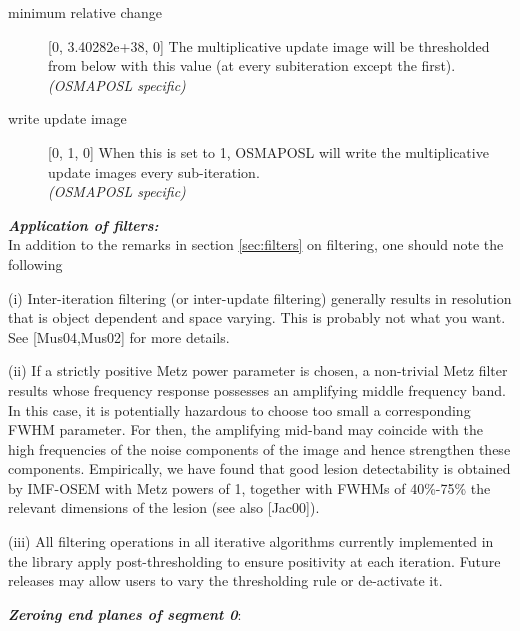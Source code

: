 \documentclass{article}
\begin{document}
\begin{description}
\item[minimum relative change] [0, 3.40282e+38, 0{]}
The multiplicative update image will be thresholded from below 
with this value (at every subiteration except the first).\\
\textit{(OSMAPOSL specific)}


\item[write update image] [0, 1, 0{]}
When this is set to 1, OSMAPOSL will write the multiplicative 
update images every sub-iteration.\\
\textit{(OSMAPOSL specific)}

\end{description}


{
}
\label{sec:OSMAPOSLtechnotes}

\textbf{\textit{Application of filters:}} \\
In addition to the remarks in section \ref{sec:filters} on filtering, 
one should 
note the following


(i) Inter-iteration filtering (or inter-update filtering) generally 
results in resolution that is object dependent and space varying. 
This is probably not what you want. See [Mus04,Mus02] for more 
details.



(ii) If a strictly positive Metz power parameter is chosen, a 
non-trivial Metz filter results whose frequency response possesses 
an amplifying middle frequency band. In this case, it is potentially 
hazardous to choose too small a corresponding FWHM parameter. 
For then, the amplifying mid-band may coincide with the high 
frequencies of the noise components of the image and hence strengthen 
these components. Empirically, we have found that good lesion 
detectability is obtained by IMF-OSEM with Metz powers of 1, 
together with FWHMs of 40\%-75\% the relevant dimensions of the 
lesion (see also [Jac00]).



(iii) All filtering operations in all iterative algorithms currently 
implemented in the library apply post-thresholding 
to ensure positivity at each iteration. Future 
releases may allow users to vary the thresholding rule or de-activate 
it.


\textbf{\textit{Zeroing end planes of segment 0}}: 
\end{document}
